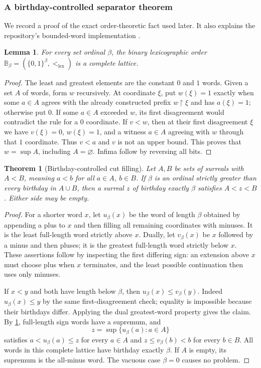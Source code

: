 \documentclass[11pt]{article}
\newtheorem{theorem}{Theorem}[section]
\newtheorem{lemma}[lemma]{Lemma}
\theoremstyle{definition}
\theoremstyle{remark}
\newcommand{\B}{\mathbb B}
\newcommand{\two}{\{0,1\}}
\newcommand{\lex}{\mathrm{lex}}
\newcommand{\restr}{\mathbin{\upharpoonright}}
\begin{document}
\subsubsection{A birthday-controlled separator theorem}

We record a proof of the exact order-theoretic fact used later. It also
explains the repository's bounded-word implementation \cite{ProveItCutFill}.

\begin{lemma}\label{swo:sk:lem:binarycomplete}
For every set ordinal $\beta$, the binary lexicographic order
$\B_\beta=(\two^\beta,<_{\lex})$ is a complete lattice.
\end{lemma}
\begin{proof}
The least and greatest elements are the constant $0$ and $1$ words.
Given a set $A$ of words, form $w$ recursively. At coordinate $\xi$, put
$w(\xi)=1$ exactly when some $a\in A$ agrees with the already constructed
prefix $w\restr\xi$ and has $a(\xi)=1$; otherwise put $0$.
If some $a\in A$ exceeded $w$, its first disagreement would contradict
the rule for a $0$ coordinate. If $v<w$, then at their first
disagreement $\xi$ we have $v(\xi)=0$, $w(\xi)=1$, and a witness
$a\in A$ agreeing with $w$ through that $1$ coordinate. Thus $v<a$ and
$v$ is not an upper bound. This proves that $w=\sup A$, including
$A=\varnothing$. Infima follow by reversing all bits.
\end{proof}

\begin{theorem}[Birthday-controlled cut filling]\label{swo:sk:thm:cut}
Let $A,B$ be sets of surreals with $A<B$, meaning $a<b$ for all
$a\in A$, $b\in B$. If $\beta$ is an ordinal strictly greater than every
birthday in $A\cup B$, then a surreal $z$ of birthday exactly $\beta$
satisfies $A<z<B$. Either side may be empty.
\end{theorem}
\begin{proof}
For a shorter word $x$, let $u_\beta(x)$ be the word of length $\beta$
obtained by appending a plus to $x$ and then filling all remaining
coordinates with minuses. It is the least full-length word strictly
above $x$. Dually, let $v_\beta(x)$ be $x$ followed by a minus and then
pluses; it is the greatest full-length word strictly below $x$.
These assertions follow by inspecting the first differing sign: an
extension above $x$ must choose plus when $x$ terminates, and the
least possible continuation then uses only minuses.

If $x<y$ and both have length below $\beta$, then
$u_\beta(x)\leq v_\beta(y)$. Indeed $u_\beta(x)\leq y$ by the same
first-disagreement check; equality is impossible because their
birthdays differ. Applying the dual greatest-word property gives the
claim. By \cref{swo:sk:lem:binarycomplete}, full-length sign words have a
supremum, and
\[
       z=\sup\{u_\beta(a):a\in A\}
\]
satisfies $a<u_\beta(a)\leq z$ for every $a\in A$ and
$z\leq v_\beta(b)<b$ for every $b\in B$. All words in this complete
lattice have birthday exactly $\beta$. If $A$ is empty, its supremum
is the all-minus word. The vacuous case $\beta=0$ causes no problem.
\end{proof}
\end{document}
